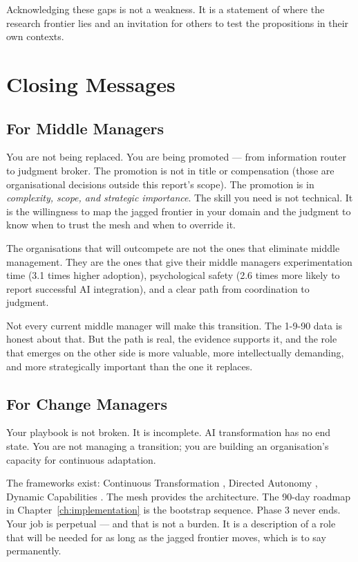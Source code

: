 Acknowledging these gaps is not a weakness. It is a statement of where the research frontier lies and an invitation for others to test the propositions in their own contexts.

\section{Closing Messages}

\subsection{For Middle Managers}

You are not being replaced. You are being promoted --- from information router to judgment broker. The promotion is not in title or compensation (those are organisational decisions outside this report's scope). The promotion is in \emph{complexity, scope, and strategic importance}. The skill you need is not technical. It is the willingness to map the jagged frontier in your domain and the judgment to know when to trust the mesh and when to override it.

The organisations that will outcompete are not the ones that eliminate middle management. They are the ones that give their middle managers experimentation time (3.1 times higher adoption), psychological safety (2.6 times more likely to report successful AI integration), and a clear path from coordination to judgment.

Not every current middle manager will make this transition. The 1-9-90 data is honest about that. But the path is real, the evidence supports it, and the role that emerges on the other side is more valuable, more intellectually demanding, and more strategically important than the one it replaces.

\subsection{For Change Managers}

Your playbook is not broken. It is incomplete. AI transformation has no end state. You are not managing a transition; you are building an organisation's capacity for continuous adaptation.

The frameworks exist: Continuous Transformation \parencite{WadeBonnet2025}, Directed Autonomy \parencite{MicrosoftDirectedAutonomy2025}, Dynamic Capabilities \parencite{Teece2025}. The mesh provides the architecture. The 90-day roadmap in Chapter~\ref{ch:implementation} is the bootstrap sequence. Phase 3 never ends. Your job is perpetual --- and that is not a burden. It is a description of a role that will be needed for as long as the jagged frontier moves, which is to say permanently.

